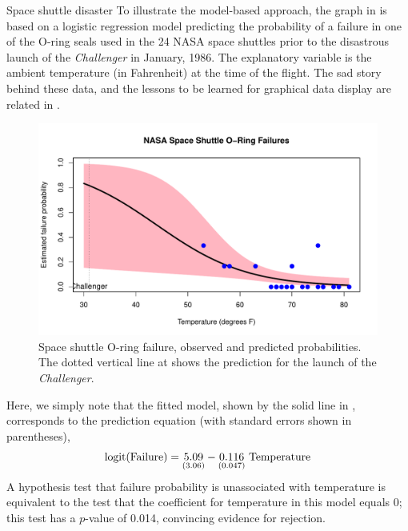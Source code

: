 \documentclass[10pt,krantz2]{krantz}\usepackage[]{graphicx}\usepackage[]{color}
\newenvironment{knitrout}{}{} %
\renewenvironment{knitrout}{\small\renewcommand{\baselinestretch}{.85}}{} %
\begin{document}
\begin{Example}[nasa0]{Space shuttle disaster}
To illustrate the model-based approach,
the graph in  is based on
a logistic regression model predicting the probability of a
failure in one of the O-ring seals used in the 24 NASA space shuttles
prior to the disastrous launch of the
\emph{Challenger} in January, 1986.  The explanatory variable is the ambient temperature (in Fahrenheit) at the time of the flight.
The sad story behind these data, and the lessons to be learned for
graphical data display are related in .

\begin{knitrout}
\color{fgcolor}\begin{figure}[!htbp]

\centerline{\includegraphics[width=.7\textwidth]{ch01/fig/spaceshuttle0-1} }

\caption[Space shuttle O-ring failure, observed and predicted probabilities]{Space shuttle O-ring failure, observed and predicted probabilities. The dotted vertical line at  shows the prediction for the launch of the \emph{Challenger}.\label{fig:spaceshuttle0}}
\end{figure}


\end{knitrout}

Here, we simply note that the fitted model, shown by the solid line in
, corresponds to the prediction equation
(with standard errors shown in parentheses),
\begin{equation*}
 \logit ( \mbox{Failure} ) =  \cwe{5.09}{3.06} - \cwe{0.116}{0.047} \mbox{ Temperature}
 \end{equation*}%
A hypothesis test that failure probability is unassociated with temperature
is equivalent to the test that the coefficient for temperature in this
model equals 0; this test has a $p$-value of 0.014, convincing evidence
for rejection.


\end{Example}
\end{document}
